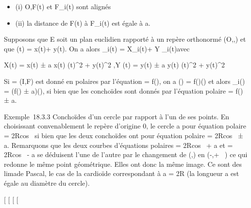\documentclass[]{article}
\begin{document}
\begin{itemize}
\itemsep1pt\parskip0pt
\item
  (i) O,F(t) et F_i(t) sont alignés
\item
  (ii) la distance de F(t) à F_i(t) est égale à a.
\end{itemize}

Supposons que E soit un plan euclidien rapporté à un repère orthonormé
(O,\vec\imath,) et que
\overrightarrowOF(t) = x(t)\vec\imath +
y(t). On a alors
\overrightarrowOF_i(t) =
X_i(t)\vec\imath + Y
_i(t) avec

X(t) = x(t) ± a x(t) \over
\sqrtx(t)^2  + y(t)^2
,\quad Y (t) = y(t) ± a y(t) \over
\sqrtx(t)^2  + y(t)^2

Si \Gamma = (I,F) est donné en polaires par l'équation \rho = f(\theta), on a
\overrightarrowOF(\theta) =
f(\theta)\vecu(\theta) et alors
\overrightarrowOF_i(\theta) = (f(\theta) ±
a)\vecu(\theta), si bien que les conchoïdes sont donnés
par l'équation polaire \rho = f(\theta) ± a.

Exemple~18.3.3 Conchoïdes d'un cercle par rapport à l'un de ses points.
En choisissant convenablement le repère d'origine 0, le cercle a pour
équation polaire \rho = 2Rcos~ \theta si bien que les
deux conchoïdes ont pour équation polaire \rho =
2Rcos~ \theta ± a. Remarquons que les deux courbes
d'équations polaires \rho = 2Rcos~ \theta + a et \rho =
2Rcos~ \theta - a se déduisent l'une de l'autre par
le changement de (\rho,\theta) en (-\rho,\theta + \pi~) ce qui redonne le même point
géométrique. Elles ont donc la même image. Ce sont des
lima\ccons de Pascal, le cas de la cardioïde
correspondant à a = 2R (la longueur a est égale au diamètre du cercle).

{[}
{[}
{[}
{[}
\end{document}
